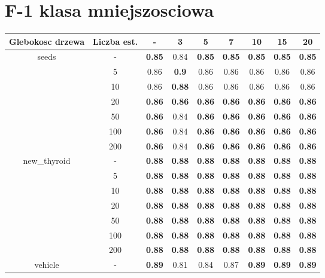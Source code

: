 \documentclass{article}%
\begin{document}
\section*{F{-}1 klasa mniejszosciowa}%
\begin{longtable}{c|c|ccccccc}%
\hline%
Glebokosc drzewa&Liczba est.&{-}&3&5&7&10&15&20\\%
\hline%
\multirow{7}{*}{seeds}&{-}&\textbf{0.85}&0.84&\textbf{0.85}&\textbf{0.85}&\textbf{0.85}&\textbf{0.85}&\textbf{0.85}\\%
\cline{2%
-%
9}%
&5&0.86&\textbf{0.9}&0.86&0.86&0.86&0.86&0.86\\%
\cline{2%
-%
9}%
&10&0.86&\textbf{0.88}&0.86&0.86&0.86&0.86&0.86\\%
\cline{2%
-%
9}%
&20&\textbf{0.86}&\textbf{0.86}&\textbf{0.86}&\textbf{0.86}&\textbf{0.86}&\textbf{0.86}&\textbf{0.86}\\%
\cline{2%
-%
9}%
&50&\textbf{0.86}&0.84&\textbf{0.86}&\textbf{0.86}&\textbf{0.86}&\textbf{0.86}&\textbf{0.86}\\%
\cline{2%
-%
9}%
&100&\textbf{0.86}&0.84&\textbf{0.86}&\textbf{0.86}&\textbf{0.86}&\textbf{0.86}&\textbf{0.86}\\%
\cline{2%
-%
9}%
&200&\textbf{0.86}&0.84&\textbf{0.86}&\textbf{0.86}&\textbf{0.86}&\textbf{0.86}&\textbf{0.86}\\%
\hline%
\multirow{7}{*}{new\_thyroid}&{-}&\textbf{0.88}&\textbf{0.88}&\textbf{0.88}&\textbf{0.88}&\textbf{0.88}&\textbf{0.88}&\textbf{0.88}\\%
\cline{2%
-%
9}%
&5&\textbf{0.88}&\textbf{0.88}&\textbf{0.88}&\textbf{0.88}&\textbf{0.88}&\textbf{0.88}&\textbf{0.88}\\%
\cline{2%
-%
9}%
&10&\textbf{0.88}&\textbf{0.88}&\textbf{0.88}&\textbf{0.88}&\textbf{0.88}&\textbf{0.88}&\textbf{0.88}\\%
\cline{2%
-%
9}%
&20&\textbf{0.88}&\textbf{0.88}&\textbf{0.88}&\textbf{0.88}&\textbf{0.88}&\textbf{0.88}&\textbf{0.88}\\%
\cline{2%
-%
9}%
&50&\textbf{0.88}&\textbf{0.88}&\textbf{0.88}&\textbf{0.88}&\textbf{0.88}&\textbf{0.88}&\textbf{0.88}\\%
\cline{2%
-%
9}%
&100&\textbf{0.88}&\textbf{0.88}&\textbf{0.88}&\textbf{0.88}&\textbf{0.88}&\textbf{0.88}&\textbf{0.88}\\%
\cline{2%
-%
9}%
&200&\textbf{0.88}&\textbf{0.88}&\textbf{0.88}&\textbf{0.88}&\textbf{0.88}&\textbf{0.88}&\textbf{0.88}\\%
\hline%
\multirow{7}{*}{vehicle}&{-}&\textbf{0.89}&0.81&0.84&0.87&\textbf{0.89}&\textbf{0.89}&\textbf{0.89}\\%

\end{longtable}
\end{document}
